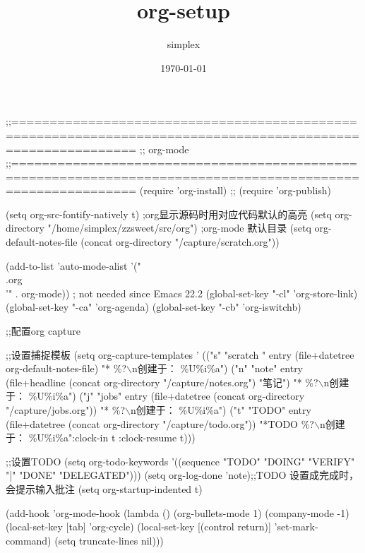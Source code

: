 \documentclass[a4paper,10pt]{article}
\author{simplex}
\date{\today}
\title{org-setup}
\begin{document}
\maketitle
\tableofcontents

;;============================================================================================================
;;                                            org-mode
;;============================================================================================================
(require 'org-install)
;; (require 'org-publish)



(setq org-src-fontify-natively t)       ;org显示源码时用对应代码默认的高亮
(setq org-directory "/home/simplex/zzsweet/src/org") ;org-mode 默认目录
(setq org-default-notes-file (concat org-directory "/capture/scratch.org"))



(add-to-list 'auto-mode-alist '("\\.org\\'" . org-mode)) ; not needed since Emacs 22.2
(global-set-key "\C-cl" 'org-store-link)
(global-set-key "\C-ca" 'org-agenda)
(global-set-key "\C-cb" 'org-iswitchb)

;;配置org capture

;;设置捕捉模板
(setq org-capture-templates '
      (("s" "scratch " entry (file+datetree org-default-notes-file)
        "* \%?$\backslash$n创建于： \%U\n  \%i\n  \%a")
       ("n" "note" entry (file+headline (concat org-directory "/capture/notes.org") "笔记")
        "* \%?$\backslash$n创建于： \%U\n  \%i\n  \%a")
       ("j" "jobs" entry (file+datetree (concat org-directory "/capture/jobs.org"))
        "* \%?$\backslash$n创建于： \%U\n  \%i\n  \%a")
       ("t" "TODO" entry (file+datetree (concat org-directory "/capture/todo.org"))
        "*TODO \%?$\backslash$n创建于： \%U\n  \%i\n  \%a":clock-in t :clock-resume t)))

;;设置TODO
(setq org-todo-keywords '((sequence "TODO" "DOING" "VERIFY" "|" "DONE" "DELEGATED")))
(setq org-log-done 'note);;TODO 设置成完成时，会提示输入批注
(setq org-startup-indented t)

(add-hook 'org-mode-hook (lambda ()
                           (org-bullets-mode 1)
                           (company-mode -1)                           
                           (local-set-key [tab] 'org-cycle)
                           (local-set-key [(control return)] 'set-mark-command)
                           (setq truncate-lines nil)))
\end{document}
